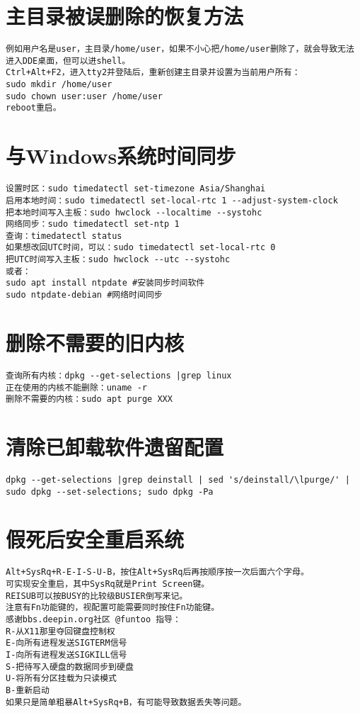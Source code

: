 \documentclass[a4paper,fontset=fandol,zihao=-4,linespread=1.2]{ctexbook}
\begin{document}
\section{主目录被误删除的恢复方法}
\begin{lstlisting}
例如用户名是user，主目录/home/user，如果不小心把/home/user删除了，就会导致无法进入DDE桌面，但可以进shell。
Ctrl+Alt+F2，进入tty2并登陆后，重新创建主目录并设置为当前用户所有：
sudo mkdir /home/user
sudo chown user:user /home/user
reboot重启。
\end{lstlisting}

\section{与Windows系统时间同步}
\begin{lstlisting}
设置时区：sudo timedatectl set-timezone Asia/Shanghai
启用本地时间：sudo timedatectl set-local-rtc 1 --adjust-system-clock
把本地时间写入主板：sudo hwclock --localtime --systohc
网络同步：sudo timedatectl set-ntp 1
查询：timedatectl status
如果想改回UTC时间，可以：sudo timedatectl set-local-rtc 0
把UTC时间写入主板：sudo hwclock --utc --systohc
或者：
sudo apt install ntpdate #安装同步时间软件
sudo ntpdate-debian #网络时间同步
\end{lstlisting}

\section{删除不需要的旧内核}
\begin{lstlisting}
查询所有内核：dpkg --get-selections |grep linux
正在使用的内核不能删除：uname -r
删除不需要的内核：sudo apt purge XXX
\end{lstlisting}

\section{清除已卸载软件遗留配置}
\begin{lstlisting}
dpkg --get-selections |grep deinstall | sed 's/deinstall/\lpurge/' | sudo dpkg --set-selections; sudo dpkg -Pa
\end{lstlisting}

\section{假死后安全重启系统}
\begin{lstlisting}
Alt+SysRq+R-E-I-S-U-B，按住Alt+SysRq后再按顺序按一次后面六个字母。
可实现安全重启，其中SysRq就是Print Screen键。
REISUB可以按BUSY的比较级BUSIER倒写来记。
注意有Fn功能键的，视配置可能需要同时按住Fn功能键。
感谢bbs.deepin.org社区 @funtoo 指导：
R-从X11那里夺回键盘控制权
E-向所有进程发送SIGTERM信号
I-向所有进程发送SIGKILL信号
S-把待写入硬盘的数据同步到硬盘
U-将所有分区挂载为只读模式
B-重新启动
如果只是简单粗暴Alt+SysRq+B，有可能导致数据丢失等问题。
\end{lstlisting}
\end{document}
